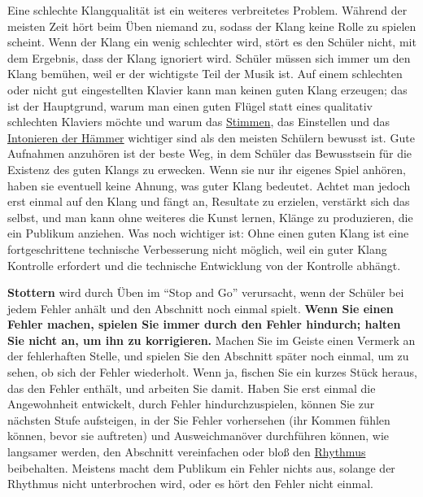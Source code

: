 Eine schlechte Klangqualität ist ein weiteres verbreitetes Problem.
Während der meisten Zeit hört beim Üben niemand zu, sodass der Klang keine Rolle zu spielen scheint.
Wenn der Klang ein wenig schlechter wird, stört es den Schüler nicht, mit dem Ergebnis, dass der Klang ignoriert wird.
Schüler müssen sich immer um den Klang bemühen, weil er der wichtigste Teil der Musik ist.
Auf einem schlechten oder nicht gut eingestellten Klavier kann man keinen guten Klang erzeugen;
das ist der Hauptgrund, warum man einen guten Flügel statt eines qualitativ schlechten Klaviers möchte und warum das \hyperref[c2_1]{Stimmen}, das Einstellen und das \hyperref[c2_7_hamm]{Intonieren der Hämmer} wichtiger sind als den meisten Schülern bewusst ist.
Gute Aufnahmen anzuhören ist der beste Weg, in dem Schüler das Bewusstsein für die Existenz des guten Klangs zu erwecken.
Wenn sie nur ihr eigenes Spiel anhören, haben sie eventuell keine Ahnung, was guter Klang bedeutet.
Achtet man jedoch erst einmal auf den Klang und fängt an, Resultate zu erzielen, verstärkt sich das selbst, und man kann ohne weiteres die Kunst lernen, Klänge zu produzieren, die ein Publikum anziehen.
Was noch wichtiger ist: Ohne einen guten Klang ist eine fortgeschrittene technische Verbesserung nicht möglich, weil ein guter Klang Kontrolle erfordert und die technische Entwicklung von der Kontrolle abhängt.

\textbf{Stottern} wird durch Üben im \enquote{Stop and Go} verursacht, wenn der Schüler bei jedem Fehler anhält und den Abschnitt noch einmal spielt.
\textbf{Wenn Sie einen Fehler machen, spielen Sie immer durch den Fehler hindurch; halten Sie nicht an, um ihn zu korrigieren.}
Machen Sie im Geiste einen Vermerk an der fehlerhaften Stelle, und spielen Sie den Abschnitt später noch einmal, um zu sehen, ob sich der Fehler wiederholt.
Wenn ja, fischen Sie ein kurzes Stück heraus, das den Fehler enthält, und arbeiten Sie damit.
Haben Sie erst einmal die Angewohnheit entwickelt, durch Fehler hindurchzuspielen, können Sie zur nächsten Stufe aufsteigen, in der Sie Fehler vorhersehen (ihr Kommen fühlen können, bevor sie auftreten) und Ausweichmanöver durchführen können, wie langsamer werden, den Abschnitt vereinfachen oder bloß den \hyperref[c1iii1b]{Rhythmus} beibehalten.
Meistens macht dem Publikum ein Fehler nichts aus, solange der Rhythmus nicht unterbrochen wird, oder es hört den Fehler nicht einmal.

